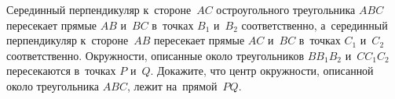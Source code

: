 \begin{problems}
\item
Серединный перпендикуляр к~стороне~$AC$ остроугольного треугольника $ABC$
пересекает прямые $AB$ и~$BC$ в~точках $B_1$ и~$B_2$ соответственно,
а~серединный перпендикуляр к~стороне~$AB$ пересекает прямые $AC$ и~$BC$
в~точках $C_1$ и~$C_2$ соответственно.
Окружности, описанные около треугольников $B B_1 B_2$ и~$C C_1 C_2$
пересекаются в~точках $P$ и~$Q$.
Докажите, что центр окружности, описанной около треугольника $ABC$, лежит
на~прямой~$PQ$.

\end{problems}


